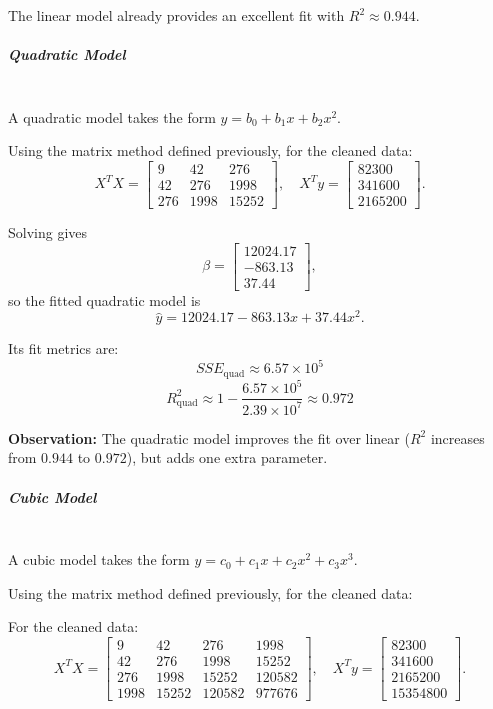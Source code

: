 The linear model already provides an excellent fit with $R^2 \approx 0.944$.

\subparagraph{Quadratic Model} \mbox{} \\
A quadratic model takes the form $y = b_0 + b_1 x + b_2 x^2$.

Using the matrix method defined previously, for the cleaned data:
\[
X^T X =
\begin{bmatrix}
9 & 42 & 276 \\
42 & 276 & 1998 \\
276 & 1998 & 15252
\end{bmatrix},
\quad
X^T y =
\begin{bmatrix}
82300 \\
341600 \\
2165200
\end{bmatrix}.
\]

Solving gives
\[
\beta =
\begin{bmatrix}
12024.17 \\
-863.13 \\
37.44
\end{bmatrix},
\]
so the fitted quadratic model is
\[
\hat{y} = 12024.17 - 863.13x + 37.44x^2.
\]

Its fit metrics are:
\[
SSE_{\text{quad}} \approx 6.57 \times 10^5
\]
\[
R^2_{\text{quad}} \approx 1 - \frac{6.57 \times 10^5}{2.39 \times 10^7} \approx 0.972
\]

\textbf{Observation:} The quadratic model improves the fit over linear ($R^2$ increases from $0.944$ to $0.972$), but adds one extra parameter.

\subparagraph{Cubic Model} \mbox{} \\
A cubic model takes the form $y = c_0 + c_1 x + c_2 x^2 + c_3 x^3$.

Using the matrix method defined previously, for the cleaned data:

For the cleaned data:
\[
X^T X =
\begin{bmatrix}
9 & 42 & 276 & 1998 \\
42 & 276 & 1998 & 15252 \\
276 & 1998 & 15252 & 120582 \\
1998 & 15252 & 120582 & 977676
\end{bmatrix},
\quad
X^T y =
\begin{bmatrix}
82300 \\
341600 \\
2165200 \\
15354800
\end{bmatrix}.
\]

